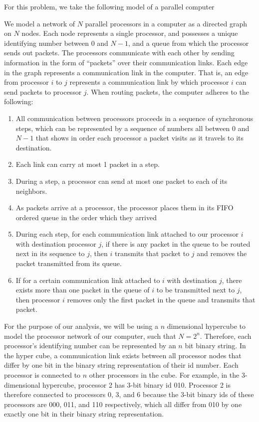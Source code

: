 \documentclass[psamsfonts, 10pt]{amsart}
\theoremstyle{definition}
\theoremstyle{remark}
\numberwithin{equation}{section}
\begin{document}
For this problem, we take the following model of a parallel computer 
\begin{adjustwidth}{3em}{3em}
We model a network of $N$ parallel processors in a computer as a directed graph on $N$ nodes. Each node represents a single processor, and possesses a unique identifying number between 0 and $N-1$, and a queue from which the processor sends out packets. The processors communicate with each other by sending information in the form of ``packets'' over their communication links. Each edge in the graph represents a communication link in the computer. That is, an edge from processor $i$ to $j$ represents a communication link by which processor $i$ can send packets to processor $j$. When routing packets, the computer adheres to the following:
\begin{enumerate}
  \item All communication between processors proceeds in a sequence of synchronous steps, which can be represented by a sequence of numbers all between $0$ and $N-1$ that shows in order each processor a packet visits as it travels to its destination.
  \item Each link can carry at most 1 packet in a step.
  \item During a step, a processor can send at most one packet to each of its neighbors.
  \item As packets arrive at a processor, the processor places them in its FIFO ordered queue in the order which they arrived
  \item During each step, for each communication link attached to our processor $i$ with destination processor $j$, if there is any packet in the queue to be routed next in its sequence to $j$, then $i$ transmits that packet to $j$ and removes the packet transmitted from its queue.
  \item If for a certain communication link attached to $i$ with destination $j$, there exists more than one packet in the queue of $i$ to be transmitted next to $j$, then processor $i$ removes only the first packet in the queue and transmits that packet.
\end{enumerate}
\end{adjustwidth}

For the purpose of our analysis, we will be using a $n$ dimensional hypercube to model the processor network of our computer, such that $N = 2^n$. Therefore, each processor's identifying number can be represented by an $n$ bit binary string. In the hyper cube, a communication link exists between all processor nodes that differ by one bit in the binary string representation of their id number. Each processor is connected to $n$ other processors in the cube. For example, in the 3-dimensional hypercube, processor 2 has 3-bit binary id 010. Processor 2 is therefore connected to processors 0, 3, and 6 because the 3-bit binary ids of these processors are 000, 011, and 110 respectively, which all differ from 010 by one exactly one bit in their binary string representation. \\
\end{document}
